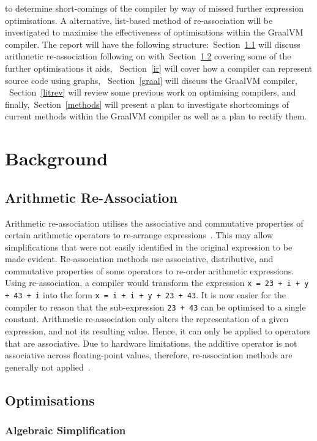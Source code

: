 \documentclass[12pt,openany,a4paper]{book}
\newcommand{\secn}[1] {Section~\ref{#1}}	%
\begin{document}
to determine short-comings of the compiler by way of missed further expression optimisations.
A alternative, list-based method of re-association will be investigated to maximise the
effectiveness of optimisations within the GraalVM compiler.
The report will have the following structure:~\secn{ara} will discuss
arithmetic re-association following on with~\secn{opt} covering some of the further optimisations it aids,
~\secn{ir} will cover how a compiler can represent source code using graphs,
~\secn{graal} will discuss the GraalVM compiler, ~\secn{litrev} will review some previous work on 
optimising compilers, and finally,~\secn{methods} will present a 
plan to investigate shortcomings of current methods within the GraalVM compiler
as well as a plan to rectify them.

\chapter{Background}
\label{bg}

\section{Arithmetic Re-Association}
\label{ara}

Arithmetic re-association utilises the associative and
commutative properties of certain arithmetic operators to re-arrange expressions~\cite{redund}. 
This may allow simplifications that were not easily identified in the original 
expression to be made evident. Re-association methods use associative,
distributive, and commutative properties of some operators to re-order arithmetic
expressions.
Using re-association, a compiler would transform the expression
\verb|x = 23 + i + y + 43 + i| into the form \verb|x = i + i + y + 23 + 43|. It
is now easier for the compiler to reason that the sub-expression \verb|23 + 43|
can be optimised to a single constant.
Arithmetic re-association only alters the representation of a given expression,
and not its resulting value. Hence, it can only be applied to operators that
are associative. Due to hardware limitations, the additive operator is not
associative across floating-point values, therefore, re-association methods are generally not
applied~\cite{floats}.

\section{Optimisations}
\label{opt}

\subsection{Algebraic Simplification}
\label{as}
\end{document}
